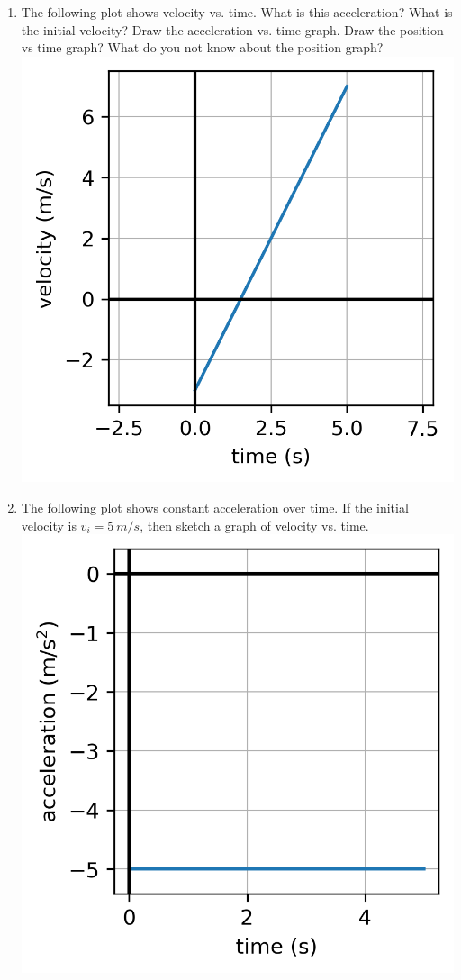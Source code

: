 \begin{enumerate}
\item The following plot shows velocity vs. time. What is this acceleration? What is the initial velocity? Draw the acceleration vs. time graph. Draw the position vs time graph? What do you not know about the position graph?\\
\includegraphics[]{week4-v1-t.png}

\item The following plot shows constant acceleration over time. If the initial velocity is $v_i=\SI{5}{m/s}$, then sketch a graph of velocity vs. time. \\
\includegraphics[]{week4-a1-t.png} 


\end{enumerate}
